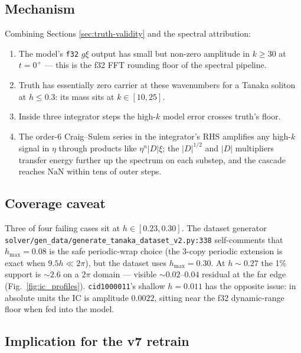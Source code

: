 \documentclass[11pt,letterpaper]{article}
\begin{document}
\subsection{Mechanism}

Combining Sections \ref{sec:truth-validity} and the spectral attribution:
\begin{enumerate}[leftmargin=1.4em,topsep=2pt,itemsep=3pt]
  \item The model's \texttt{f32} $g\xi$ output has small but non-zero amplitude in
        $k\!\geq\!30$ at $t=0^{+}$ --- this is the f32 FFT rounding floor of the spectral
        pipeline.
  \item Truth has essentially zero carrier at these wavenumbers for a Tanaka soliton at
        $h\!\leq\!0.3$: its mass sits at $k\!\in\![10,25]$.
  \item Inside three integrator steps the high-$k$ model error crosses truth's floor.
  \item The order-$6$ Craig--Sulem series in the integrator's RHS amplifies any high-$k$
        signal in $\eta$ through products like $\eta^{n}|D|\xi$; the $|D|^{1/2}$ and
        $|D|$ multipliers transfer energy further up the spectrum on each substep, and the
        cascade reaches $\mathrm{NaN}$ within tens of outer steps.
\end{enumerate}

\subsection{Coverage caveat}
\label{sec:coverage}

Three of four failing cases sit at $h\!\in\![0.23, 0.30]$. The dataset generator
\texttt{solver/gen\_data/generate\_tanaka\_dataset\_v2.py:338} self-comments that
$h_{\max}=0.08$ is the safe periodic-wrap choice (the 3-copy periodic extension is exact
when $9.5h\!\ll\!2\pi$), but the dataset uses $h_{\max}=0.30$. At $h\!\sim\!0.27$ the 1\%
support is $\sim\!2.6$ on a $2\pi$ domain --- visible $\sim 0.02$--$0.04$ residual at the
far edge (Fig.~\ref{fig:ic_profiles}). \texttt{cid1000011}'s shallow $h=0.011$ has the
opposite issue: in absolute units the IC is amplitude $0.0022$, sitting near the f32
dynamic-range floor when fed into the model.

\subsection{Implication for the v7 retrain}
\end{document}
